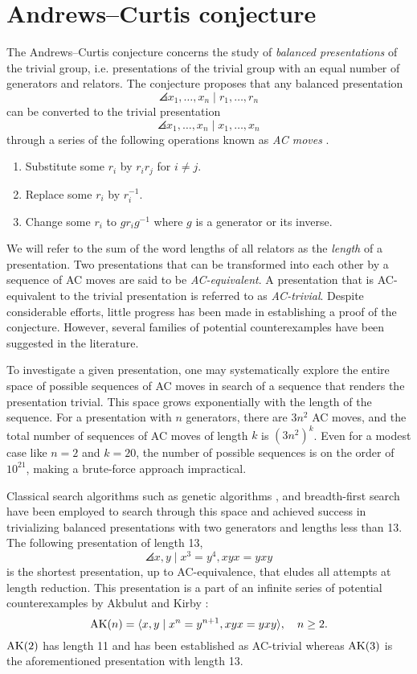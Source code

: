 
\section{Andrews--Curtis conjecture\label{sec:AC}}

The Andrews--Curtis conjecture concerns the study of \textit{balanced presentations} of the trivial group, i.e.
presentations of the trivial group with an equal number of generators and relators.
The conjecture proposes that any balanced presentation
\[
\angles{x_1, \dots, x_n \mid r_1, \dots, r_n}
\]
can be converted to the trivial presentation
\[
\angles{x_1, \dots, x_n \mid x_1, \dots, x_n}
\]
through a series of the following operations known as \textit{AC moves} \cite{Andrews--Curtis}.
\begin{enumerate}[label=(AC\arabic*)]
	\item Substitute some $r_i$ by $r_i r_j$ for $i \neq j$.
	\item Replace some $r_i$ by $r_i^{-1}$.
	\item Change some $r_i$ to $g r_i g^{-1}$ where $g$ is a generator or its inverse.
\end{enumerate}
We will refer to the sum of the word lengths of all relators as the \textit{length} of a presentation.
Two presentations that can be transformed into each other by a sequence of AC moves are said to be \textit{AC-equivalent}.
A presentation that is AC-equivalent to the trivial presentation is referred to as \textit{AC-trivial}.
Despite considerable efforts, little progress has been made in establishing a proof of the conjecture.
However, several families of potential counterexamples have been suggested in the literature.

To investigate a given presentation, one may systematically explore the entire space of possible sequences of AC moves in search of a sequence that renders the presentation trivial.
This space grows exponentially with the length of the sequence.
For a presentation with $n$ generators, there are $3n^2$ AC moves, and the total number of sequences of AC moves of length $k$ is $(3n^2)^k$.
Even for a modest case like $n=2$ and $k=20$, the number of possible sequences is on the order of $10^{21}$, making a brute-force approach impractical.
\newline

Classical search algorithms such as genetic algorithms \cite{genetic}, and breadth-first search \cite{bfs-ac} have been employed to search through this space and achieved success in trivializing balanced presentations with two generators and lengths less than 13.
The following presentation of length 13,
\[
\angles{x, y \mid x^3 = y^4, xyx = yxy}
\]
is the shortest presentation, up to AC-equivalence, that eludes all attempts at length reduction.
This presentation is a part of an infinite series of potential counterexamples by Akbulut and Kirby \cite{Akbulut--Kirby}:
\[
\text{AK}(n) = \langle x, y \mid x^n = y^{n+1}, xyx = yxy\rangle, \quad n \geq 2.
\]
$\text{AK}(2)$ has length 11 and has been established as AC-trivial \cite{genetic} whereas $\text{AK}(3)$ is the aforementioned presentation with length 13.
\newline

